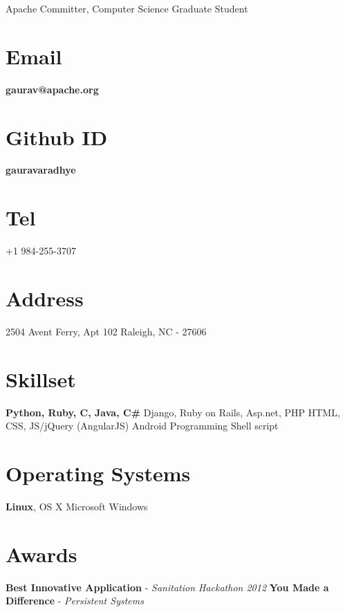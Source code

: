 \documentclass[]{friggeri-cv}
\begin{document}
      {Apache Committer, Computer Science Graduate Student}
      
\noindent\hspace{-0.16\textwidth}\makebox[\linewidth]{\rule{19.5cm}{0.4pt}}

\begin{aside}
\vspace{30 mm} \leavevmode
  \section{Email}
    \textbf{gaurav@apache.org}
    ~
  \section{Github ID}
    \textbf{gauravaradhye}
    ~
  \section{Tel}
    +1 984-255-3707
    ~
  \section{Address}
    2504 Avent Ferry, Apt 102
    Raleigh, NC - 27606
    ~
  \section{Skillset}
        \textbf{Python, Ruby, C, Java, C\#}
        Django, Ruby on Rails, \leavevmode
        Asp.net, PHP
        HTML, CSS, JS/jQuery (AngularJS)
        Android Programming
        Shell script
~
  \section{Operating Systems}
        \textbf{Linux}, OS X\leavevmode
        Microsoft Windows
~
  \section{Awards}
        \textbf{Best Innovative Application} -
        \emph{Sanitation Hackathon 2012}
        \vspace{1mm} \leavevmode
        \textbf{You Made a Difference} -
        \emph{Persistent Systems}
~
\end{aside}
\end{document}
